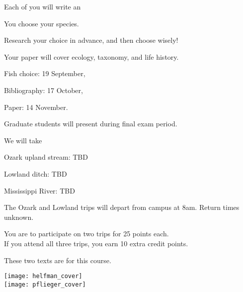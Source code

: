 \documentclass[t]{beamer}
\begin{document}
\begin{frame}[t,plain]{Each of you will write an }

	\hangpara You choose your species.
	
	\hspace{2em} Research your choice in advance, and then choose wisely! 

	\hangpara Your paper will cover ecology, taxonomy, and life history.

	\hangpara {}
	
	\hspace{2em} Fish choice: 19 September,
	
	\hspace{2em} Bibliography: 17 October,
	
	\hspace{2em} Paper: 14 November.
	
	\hangpara Graduate students will present during final exam period.

\end{frame}

\begin{frame}[t,plain]{We will take }

	\hangpara Ozark upland stream: TBD %
	
	\hangpara Lowland ditch: TBD %

	\hangpara Mississippi River: TBD %


	\hangpara
	
	\hangpara The Ozark and Lowland trips will depart from campus at 8am. Return times unknown.
	
	\hangpara You are  to participate on two trips for 25 points each.\\ If you attend all three trips, you earn 10  extra credit points.
	
\end{frame}

\begin{frame}[t,plain]{These two texts are for this course.}
\begin{multicols}{2}
	\begin{center}
		\texttt{[image: helfman\_cover]} \\
		\texttt{[image: pflieger\_cover]} \\
	\end{center}
\end{multicols}
\end{frame}
\end{document}
